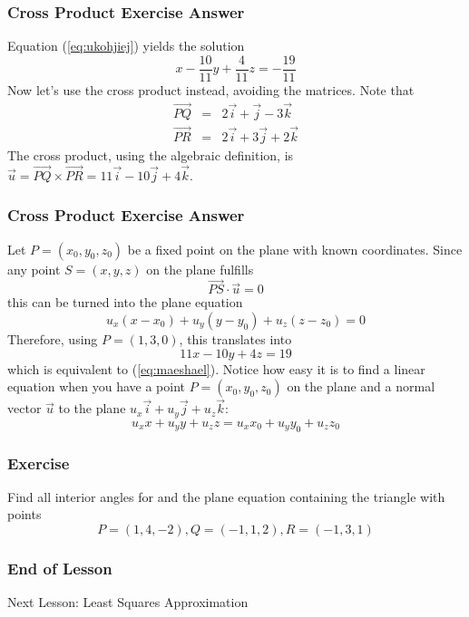 \documentclass[xcolor=dvipsnames]{beamer}
\begin{document}
\begin{frame}
  \frametitle{Cross Product Exercise Answer}
  Equation (\ref{eq:ukohjiej}) yields the solution
  \begin{equation}
    \label{eq:maeshael}
      x-\frac{10}{11}y+\frac{4}{11}z=-\frac{19}{11}
  \end{equation}
Now let's use the cross product instead, avoiding the matrices. Note
that
\begin{equation}
  \label{eq:ushahroh}
  \begin{array}{rcl}
    \vec{PQ}&=&2\vec{i}+\vec{j}-3\vec{k} \\
    \vec{PR}&=&2\vec{i}+3\vec{j}+2\vec{k}
  \end{array}
\end{equation}
The cross product, using the algebraic definition, is
$\vec{u}=\vec{PQ}\times\vec{PR}=11\vec{i}-10\vec{j}+4\vec{k}$.
\end{frame}

\begin{frame}
  \frametitle{Cross Product Exercise Answer}
  Let $P=(x_{0},y_{0},z_{0})$ be a fixed point on the plane with known
  coordinates. Since any point $S=(x,y,z)$ on the plane fulfills
\begin{equation}
  \label{eq:iefeeboh}
  \vec{PS}\cdot\vec{u}=0
\end{equation}
this can be turned into the plane equation
\begin{equation}
  \label{eq:vetiexup}
  u_{x}(x-x_{0})+u_{y}(y-y_{0})+u_{z}(z-z_{0})=0
\end{equation}
Therefore, using $P=(1,3,0)$, this translates into
\begin{equation}
  \label{eq:eechawoi}
11x-10y+4z=19  
\end{equation}
which is equivalent to (\ref{eq:maeshael}). Notice how easy it is to
find a linear equation when you have a point $P=(x_{0},y_{0},z_{0})$
on the plane and a normal vector $\vec{u}$ to the plane
$u_{x}\vec{i}+u_{y}\vec{j}+u_{z}\vec{k}$:
\begin{equation}
  \label{eq:quaghoob}
u_{x}x+u_{y}y+u_{z}z=u_{x}x_{0}+u_{y}y_{0}+u_{z}z_{0}
\end{equation}
\end{frame}

\begin{frame}
  \frametitle{Exercise}
  {\ubung} Find all interior angles for and the plane equation
  containing the triangle with points
  \begin{equation}
    \label{eq:yeibieba}
    P=(1,4,-2),Q=(-1,1,2),R=(-1,3,1)
  \end{equation}
\end{frame}

\begin{frame}
  \frametitle{End of Lesson}
Next Lesson: Least Squares Approximation
\end{frame}
\end{document}

